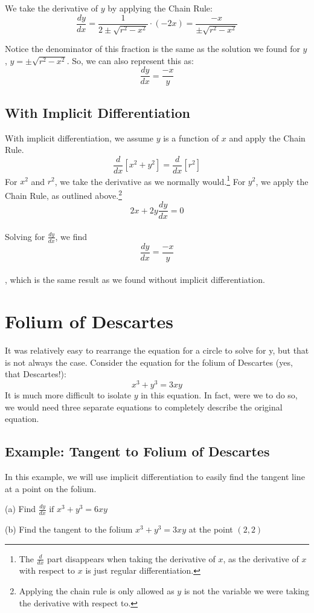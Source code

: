We take the derivative of $y$ by applying the Chain Rule:
$$\frac{dy}{dx}=\frac{1}{2 \pm \sqrt{r^2 - x^2}} \cdot (- 2x) = 
\frac{-x}{\pm \sqrt{r^2 - x^2}}$$ 

Notice the denominator of this fraction is the same as the solution 
we found for $y$, $y=\pm \sqrt{r^2-x^2}$. So, we can also represent 
this as: $$\frac{dy}{dx}=\frac{-x}{y}$$

\subsection{With Implicit Differentiation}
With implicit differentiation, we assume $y$ is a function of $x$ and 
apply the Chain Rule. $$\frac{d}{dx}[x^2+y^2]=\frac{d}{dx}[r^2]$$ For 
$x^2$ and $r^2$, we take the derivative as we normally would.\footnote{The $\frac{d}{dx}$ part disappears when taking the derivative of $x$, as the derivative of $x$ with respect to $x$ is just regular differentiation.} For 
$y^2$, we apply the Chain Rule, as outlined above.\footnote{Applying the chain rule is only allowed as $y$ is not the variable we were taking the derivative with respect to.} 
$$2x+2y\frac{dy}{dx}=0$$\\ Solving for $\frac{dy}{dx}$, we find 
$$\frac{dy}{dx}=\frac{-x}{y}$$ \\, which is the same result as we found 
without implicit differentiation. 

\section{Folium of Descartes}
It was relatively easy to rearrange the equation for a circle to 
solve for y, but that is not always the case. Consider the equation 
for the folium of Descartes (yes, that Descartes!): $$x^3+y^3=3xy$$ 
It is much more difficult to isolate $y$ in this equation. In fact, 
were we to do so, we would need three separate equations to completely 
describe the original equation. 

\subsection{Example: Tangent to Folium of Descartes}

In this example, we will use implicit differentiation to easily find 
the tangent line at a point on the folium. 

(a) Find $\frac{dy}{dx} \text{ if } x^3+y^3 = 6xy$

(b) Find the tangent to the folium $x^3+y^3=3xy$ at the point $(2, 2)$

